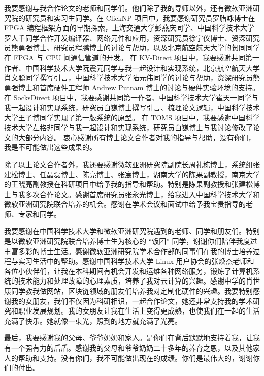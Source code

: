 \begin{acknowledgements}
我要感谢与我合作论文的老师和同学们。他们除了我的导师以外，还有微软亚洲研究院的研究员和实习生同学。在 ClickNP 项目中，我要感谢研究员罗腊咏博士在 FPGA 编程框架方面的早期探索，上海交通大学彭燕庆同学、中国科学技术大学罗人千同学合作开发编译器、网络元件和应用，资深研究员徐宁仪博士、资深研究员熊勇强博士、研究员程鹏博士的讨论与帮助，以及北京航空航天大学的贺同同学在 FPGA 与 CPU 间通信管道的开发。
在 KV-Direct 项目中，我要感谢共同第一作者、中国科学技术大学阮震元同学与我一起设计和实现系统，北京航空航天大学肖文聪同学撰写引言，中国科学技术大学陆元伟同学的讨论与帮助，资深研究员熊勇强博士和首席硬件工程师 Andrew Putnam 博士的讨论与硬件实验环境的支持。
在 SocksDirect 项目中，我要感谢共同第一作者、中国科学技术大学崔天一同学与我一起设计和实现系统，研究员白巍博士撰写引言、梳理论文逻辑，中国科学技术大学王子博同学实现了第一版系统的原型。
在 TOMS 项目中，我要感谢中国科学技术大学左格非同学与我一起设计和实现系统，研究员白巍博士与我讨论修改了论文的大部分内容。
衷心感谢所有博士论文合作者对我的指导与帮助，没有你们，我是不可能做出这些成果的。

除了以上论文合作者外，我还要感谢微软亚洲研究院副院长周礼栋博士，系统组张建松博士、任晶磊博士、陈亮博士、张宸博士，湖南⼤学的陈果副教授，南京⼤学的王晓亮副教授在科研项⽬中给予我的指导和帮助。特别是陈果副教授和张建松博士与我多次合作论文。感谢首席研究员张永光博士，给我进入中国科学技术⼤学和微软亚洲研究院联合培养的机会。感谢在学术会议和面试中给予我宝贵指导的老师、专家和同学。

我要感谢在中国科学技术⼤学和微软亚洲研究院遇到的⽼师、同学和朋友们。特别是以微软亚洲研究院联合培养博士生为核心的 ``饭团'' 同学，谢谢你们陪伴我度过丰富多彩的博士生活。感谢微软亚洲研究院学术合作部的同事们在我的博士培养过程与实习生活中的帮助。感谢中国科学技术大学 Linux 用户协会的张焕杰老师和各位小伙伴们，让我在本科期间有机会开发和运维各种网络服务，锻炼了计算机系统的技术能力和处理故障的心理素质，培养了我对云计算的兴趣。感谢中学的肖世康同学教我做网站，区块链领域的朋友们培养我对定制化硬件的兴趣。我要特别感谢我的女朋友，我们不仅因为科研相识，一起合作论文，她还非常支持我的学术研究和职业发展规划。我的女朋友让我在生活上变得更成熟，也使我们在一起的生活充满了快乐。她就像一束光，照到的地方就充满了光亮。

最后，我要感谢我的⽗母、爷爷奶奶和家⼈。是你们在背后默默地⽀持着我，让我有⼀个强有⼒的后盾。感谢我的⽗母和爷爷奶奶⼆⼗多年的养育之恩，以及其他家⼈的帮助和⽀持。没有你们，我不可能做出现在的成绩。你们是最伟⼤的，谢谢你们的付出。
\end{acknowledgements}
